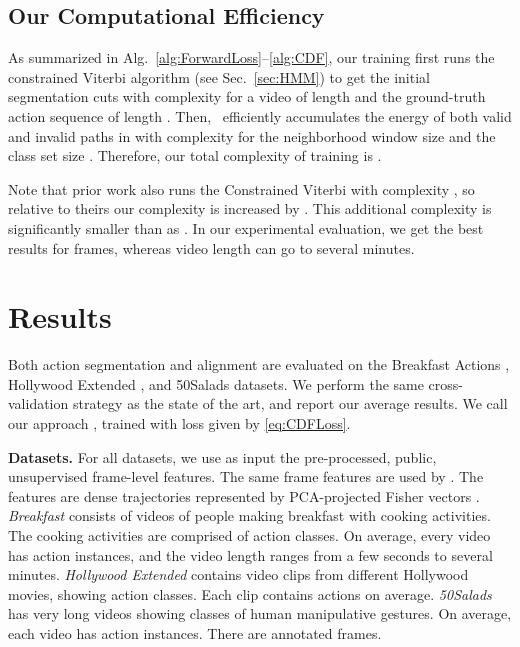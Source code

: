 \documentclass[10pt,twocolumn,letterpaper]{article}
\begin{document}
\subsection{Our Computational Efficiency}\label{sec:Effectiveness}

As summarized in Alg.~\ref{alg:ForwardLoss}--\ref{alg:CDF}, our training first runs the constrained Viterbi algorithm (see Sec.~\ref{sec:HMM}) to get the initial segmentation cuts with complexity   for a video of length  and the ground-truth action sequence of length . Then, \abbrmodel\ efficiently accumulates the energy of both valid and invalid paths in  with complexity  for the neighborhood window size  and the class set size . Therefore, our total complexity of training is . 

Note that prior work \cite{richard2018neuralnetwork} also runs the Constrained Viterbi with complexity , so relative to theirs our complexity is increased by . This additional complexity is significantly smaller than  as . In our experimental evaluation, we get the best results for   frames, whereas video length  can go to several minutes.





\section{Results}\label{sec:Experiment}

Both action segmentation and alignment are evaluated on the Breakfast Actions \cite{kuehne2014language}, Hollywood Extended \cite{bojanowski2014weakly}, and 50Salads \cite{stein2013combining} datasets. We perform the same cross-validation strategy as the state of the art, and report our average results. 
We call our approach  \abbrmodel, trained with loss given by \eqref{eq:CDFLoss}.

{\bf Datasets.} For all datasets, we use as input the pre-processed, public, unsupervised frame-level features. The same frame features are used by \cite{huang2016connectionist, richard2017weaklysupervised, richard2017weakly, richard2018neuralnetwork}. The features are dense trajectories represented by PCA-projected Fisher vectors \cite{kuehne2016end}. {\em Breakfast} \cite{kuehne2014language} consists of  videos of people making breakfast with  cooking activities. The cooking activities are comprised of  action classes. On average, every video has  action instances, and the video length ranges from a few seconds to several minutes. {\em Hollywood Extended} \cite{bojanowski2014weakly} contains  video clips from different Hollywood movies, showing  action classes. Each clip contains  actions on average. {\em 50Salads} \cite{stein2013combining} has  very long videos showing  classes of human manipulative gestures. On average, each video has  action instances. There are  annotated frames.
\end{document}
